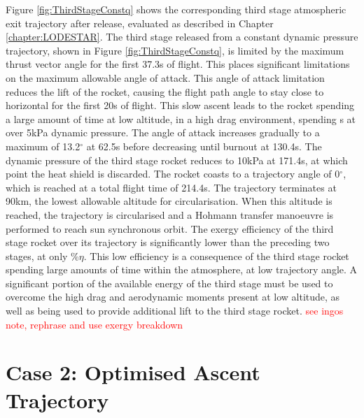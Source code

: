 Figure \ref{fig:ThirdStageConstq} shows the corresponding third stage atmospheric exit trajectory after release, evaluated as described in Chapter \ref{chapter:LODESTAR}. The third stage released from a constant dynamic pressure trajectory, shown in Figure \ref{fig:ThirdStageConstq}, is limited by the maximum thrust vector angle for the first 37.3s of flight. This places significant limitations on the maximum allowable angle of attack. This angle of attack limitation reduces the lift of the rocket, causing the flight path angle to stay close to horizontal for the first 20s of flight. This slow ascent leads to the rocket spending a large amount of time at low altitude, in a high drag environment, spending \thirdqOverFiveConstqNoReturn s at over 5kPa dynamic pressure. The angle of attack increases gradually to a maximum of 13.2$^\circ$ at 62.5s before decreasing until burnout at 130.4s. The dynamic pressure of the third stage rocket reduces to 10kPa at 171.4s, at which point the heat shield is discarded. The rocket coasts to a trajectory angle of 0$^\circ$, which is reached at a total flight time of 214.4s. The trajectory terminates at 90km, the lowest allowable altitude for circularisation. 
When this altitude is reached, the trajectory is circularised and a Hohmann transfer manoeuvre is performed to reach sun synchronous orbit.
The exergy efficiency of the third stage rocket over its trajectory is significantly lower than the preceding two stages, at only \thirddExergyEffConstqNoReturn\%$\eta$. This low efficiency is a consequence of the third stage rocket spending large amounts of time within the atmosphere, at low trajectory angle. A significant portion of the available energy of the third stage must be used to overcome the high drag and aerodynamic moments present at low altitude, as well as being used to provide additional lift to the third stage rocket.  
\textcolor{red}{see ingos note, rephrase and use exergy breakdown}






\section{Case 2: Optimised Ascent Trajectory}\label{sec:optimisednoreturn}


